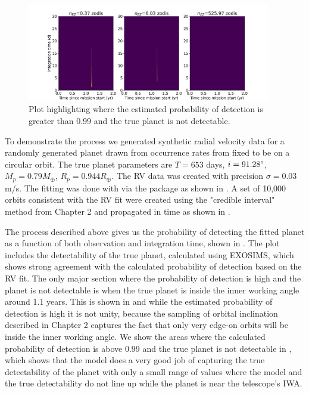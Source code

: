 \begin{figure}
  \begin{center}
    \includegraphics[width=0.95\textwidth]{ch3/figures/pdet_colored_true_err.png}
  \end{center}
  \caption{Plot highlighting where the estimated probability of detection is greater
  than 0.99 and the true planet is not detectable.}
  \label{fig:pdet_colored_true_err}
\end{figure}


To demonstrate the process we generated synthetic radial velocity data for a
randomly generated planet drawn from occurrence rates from
\citet{dulzJointRadialVelocity2020} fixed to be on a circular orbit. The true
planet parameters are $T=653$ days, $i=91.28\degree$, $M_p=0.79 M_\oplus$, $R_p
= 0.944 R_\oplus$. The RV data was created with precision $\sigma=0.03$ m/s.
The fitting was done with  \citep{fultonRadvelRadialVelocity2018}
via the  package \citep{rosenthalCaliforniaLegacy2021} as shown in . A set of 10,000 orbits consistent with the RV
fit were created using the "credible interval" method from Chapter 2 and
propagated in time as shown in .

The process described above gives us the probability of detecting the
fitted planet as a function of both observation and integration time, shown in
. The plot includes the detectability of
the true planet, calculated using EXOSIMS, which shows strong agreement with
the calculated probability of detection based on the RV fit. The only major
section where the probability of detection is high and the planet is not
detectable is when the true planet is inside the inner working angle around 1.1
years. This is shown in  and while the
estimated probability of detection is high it is not unity, because the
sampling of orbital inclination described in Chapter 2 captures the fact that
only very edge-on orbits will be inside the inner working angle. We show
the areas where the calculated probability of detection is above 0.99 and the
true planet is not detectable in , which
shows that the model does a very good job of capturing the true detectability
of the planet with only a small range of values where the model and the true
detectability do not line up while the planet is near the telescope's IWA.


